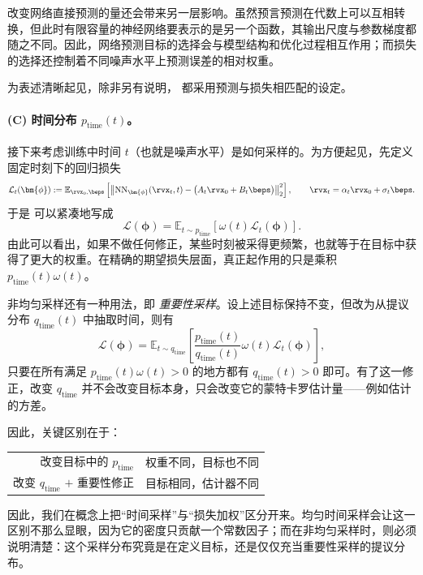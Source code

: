 改变网络直接预测的量还会带来另一层影响。虽然预言预测在代数上可以互相转换，但此时有限容量的神经网络要表示的是另一个函数，其输出尺度与参数梯度都随之不同。因此，网络预测目标的选择会与模型结构和优化过程相互作用；而损失的选择还控制着不同噪声水平上预测误差的相对权重。

为表述清晰起见，除非另有说明， 都采用预测与损失相匹配的设定。


\paragraph{(C) 时间分布 $p_{\text{time}}(t)$。}
接下来考虑训练中时间 $t$（也就是噪声水平）是如何采样的。为方便起见，先定义固定时刻下的回归损失
\[
\mathcal{L}_t(\bm{\phi})
:=
\mathbb{E}_{\rvx_0,\beps}
\left[
\left\|
\mathrm{NN}_{\bm{\phi}}(\rvx_t,t)
-
\bigl(A_t\rvx_0+B_t\beps\bigr)
\right\|_2^2
\right],
\qquad
\rvx_t=\alpha_t\rvx_0+\sigma_t\beps.
\]
于是  可以紧凑地写成
\[
\mathcal{L}(\bm{\phi})
=
\mathbb{E}_{t\sim p_{\text{time}}}
\left[
\omega(t)\mathcal{L}_t(\bm{\phi})
\right].
\]
由此可以看出，如果不做任何修正，某些时刻被采得更频繁，也就等于在目标中获得了更大的权重。在精确的期望损失层面，真正起作用的只是乘积 $p_{\text{time}}(t)\omega(t)$。

非均匀采样还有一种用法，即 \emph{重要性采样}。设上述目标保持不变，但改为从提议分布
$q_{\text{time}}(t)$ 中抽取时间，则有
\[
\mathcal{L}(\bm{\phi})
=
\mathbb{E}_{t\sim q_{\text{time}}}
\left[
\frac{p_{\text{time}}(t)}{q_{\text{time}}(t)}
\omega(t)\mathcal{L}_t(\bm{\phi})
\right],
\]
只要在所有满足 $p_{\text{time}}(t)\omega(t)>0$ 的地方都有 $q_{\text{time}}(t)>0$ 即可。有了这一修正，改变 $q_{\text{time}}$ 并不会改变目标本身，只会改变它的蒙特卡罗估计量——例如估计的方差。

因此，关键区别在于：
\begin{center}
\small
\renewcommand{\arraystretch}{1.3}
\begin{tabular}{@{}r@{\;\;$\Longrightarrow$\;\;}l@{}}
改变目标中的 $p_{\text{time}}$
&
权重不同，目标也不同
\\
改变 $q_{\text{time}}$ $+$ 重要性修正
&
目标相同，估计器不同
\end{tabular}
\end{center}

因此，我们在概念上把“时间采样”与“损失加权”区分开来。均匀时间采样会让这一区别不那么显眼，因为它的密度只贡献一个常数因子；而在非均匀采样时，则必须说明清楚：这个采样分布究竟是在定义目标，还是仅仅充当重要性采样的提议分布。

